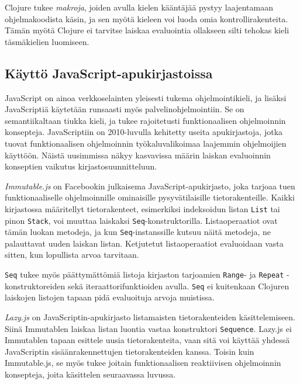 Clojure tukee \textit{makroja}, joiden avulla kielen kääntäjää pystyy laajentamaan ohjelmakoodista käsin, ja sen myötä kieleen voi luoda omia kontrollirakenteita. Tämän myötä Clojure ei tarvitse laiskaa evaluointia ollakseen silti tehokas kieli täsmäkielien luomiseen.

\subsection{Käyttö JavaScript-apukirjastoissa}

JavaScript on ainoa verkkoselainten yleisesti tukema ohjelmointikieli, ja lisäksi JavaScriptiä käytetään runsaasti myös palvelinohjelmointiin. Se on semantiikaltaan tiukka kieli, ja tukee rajoitetusti funktionaalisen ohjelmoinnin konsepteja.  JavaScriptiin on 2010-luvulla kehitetty useita apukirjastoja, jotka tuovat funktionaalisen ohjelmoinnin työkaluvalikoimaa laajemmin ohjelmoijien käyttöön. Näistä uusimmissa näkyy kasvavissa määrin laiskan evaluoinnin konseptien vaikutus kirjastosuunnitteluun.

\textit{Immutable.js} on Facebookin julkaisema JavaScript-apukirjasto, joka tarjoaa tuen funktionaaliselle ohjelmoinnille ominaisille pysyvätilaisille tietorakenteille. Kaikki kirjastossa määritellyt tietorakenteet, esimerkiksi indeksoidun listan \verb!List! tai pinon \verb!Stack!, voi muuttaa laiskaksi \verb!Seq!-konstruktorilla. Listaoperaatiot ovat tämän luokan metodeja, ja kun \verb!Seq!-instanssille kutsuu näitä metodeja, ne palauttavat uuden laiskan listan.
Ketjutetut listaoperaatiot evaluoidaan vasta sitten, kun lopullista arvoa tarvitaan.

\begin{sloppypar}
\verb!Seq! tukee myös päättymättömiä listoja kirjaston tarjoamien \verb!Range!- ja \verb!Repeat! \mbox{-konstruktoreiden} sekä iteraattorifunktioiden avulla. \verb!Seq! ei kuitenkaan Clojuren laiskojen listojen tapaan pidä evaluoituja arvoja muistissa.
\end{sloppypar}

\textit{Lazy.js} on JavaScriptin-apukirjasto listamaisten tietorakenteiden käsittelemiseen. Siinä Immutablen laiskaa listan luontia vastaa konstruktori \verb!Sequence!. Lazy.js ei Immutablen tapaan esittele uusia tietorakenteita, vaan sitä voi käyttää yhdessä JavaScriptin sisäänrakennettujen tietorakenteiden kanssa. Toisin kuin Immutable.js, se myös tukee joitain funktionaalisen reaktiivisen ohjelmoinnin konsepteja, joita käsittelen seuraavassa luvussa.

